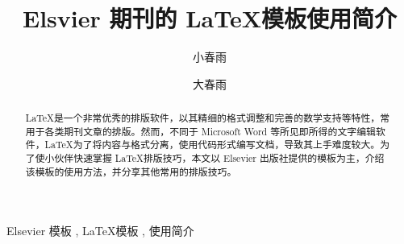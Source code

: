 \documentclass[3p,onecolumn]{elsarticle}
\begin{document}
    \begin{frontmatter}
        \title{Elsvier 期刊的 \LaTeX 模板使用简介}

        \author[1]{小春雨}
        \author[2]{大春雨 }

        \address[1]{手动使用逗号或句号分割的，完整的，可自定义内容的地址}


        \begin{abstract}
            \LaTeX 是一个非常优秀的排版软件，以其精细的格式调整和完善的数学支持等特性，常用于各类期刊文章的排版。然而，不同于 Microsoft Word 等所见即所得的文字编辑软件，\LaTeX 为了将内容与格式分离，使用代码形式编写文档，导致其上手难度较大。为了使小伙伴快速掌握 \LaTeX 排版技巧，本文以 Elsevier 出版社提供的模板为主，介绍该模板的使用方法，并分享其他常用的排版技巧。
        \end{abstract}

        \begin{keyword}
            Elsevier 模板 \sep 
            \LaTeX 模板 \sep
            使用简介
        \end{keyword}
    \end{frontmatter}

    


    
\end{document}
